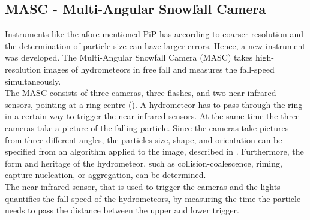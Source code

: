 \subsection{MASC - Multi-Angular Snowfall Camera}

Instruments like the afore mentioned PiP has according to \cite{garrett_fall_2012} coarser resolution and the determination of particle size can have larger errors. Hence, a new instrument was developed. The Multi-Angular Snowfall Camera (MASC) takes high-resolution images of hydrometeors in free fall and measures the fall-speed simultaneously. \\
The MASC consists of three cameras, three flashes, and two near-infrared sensors, pointing at a ring centre (). A hydrometeor has to pass through the ring in a certain way to trigger the near-infrared sensors. At the same time the three cameras take a picture of the falling particle. Since the cameras take pictures from three different angles, the particles size, shape, and orientation can be specified from an algorithm applied to the image, described in \cite{garrett_fall_2012}. Furthermore, the form and heritage of the hydrometeor, such as collision-coalescence, riming, capture nucleation, or aggregation, can be determined. \\
The near-infrared sensor, that is used to trigger the cameras and the lights quantifies the fall-speed of the hydrometeors, by measuring the time the particle needs to pass the distance between the upper and lower trigger.    
